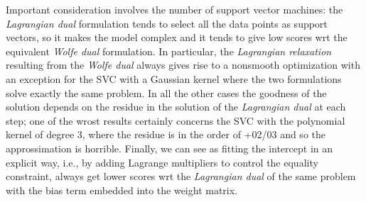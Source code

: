 Important consideration involves the number of support vector machines: the \emph{Lagrangian dual} formulation tends to select all the data points as support vectors, so it makes the model complex and it tends to give low scores wrt the equivalent \emph{Wolfe dual} formulation. In particular, the \emph{Lagrangian relaxation} resulting from the \emph{Wolfe dual} always gives rise to a nonsmooth optimization with an exception for the SVC with a Gaussian kernel where the two formulations solve exactly the same problem. In all the other cases the goodness of the solution depends on the residue in the solution of the \emph{Lagrangian dual} at each step; one of the wrost results certainly concerns the SVC with the polynomial kernel of degree 3, where the residue is in the order of +02/03 and so the approssimation is horrible. Finally, we can see as fitting the intercept in an explicit way, i.e., by adding Lagrange multipliers to control the equality constraint, always get lower scores wrt the \emph{Lagrangian dual} of the same problem with the bias term embedded into the weight matrix.